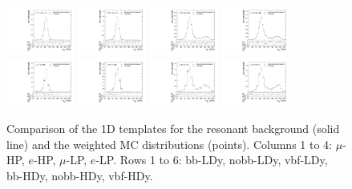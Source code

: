 \begin{figure}[htbp]
  \includegraphics[width=0.2\textwidth]{fig/2Dfit/templateVsReco_res_r0_MJ_mu_HP_nobb_HDy.pdf}
  \includegraphics[width=0.2\textwidth]{fig/2Dfit/templateVsReco_res_r0_MJ_e_HP_nobb_HDy.pdf}
  \includegraphics[width=0.2\textwidth]{fig/2Dfit/templateVsReco_res_r0_MJ_mu_LP_nobb_HDy.pdf}
  \includegraphics[width=0.2\textwidth]{fig/2Dfit/templateVsReco_res_r0_MJ_e_LP_nobb_HDy.pdf}\\
  \includegraphics[width=0.2\textwidth]{fig/2Dfit/templateVsReco_res_r0_MJ_mu_HP_vbf_HDy.pdf}
  \includegraphics[width=0.2\textwidth]{fig/2Dfit/templateVsReco_res_r0_MJ_e_HP_vbf_HDy.pdf}
  \includegraphics[width=0.2\textwidth]{fig/2Dfit/templateVsReco_res_r0_MJ_mu_LP_vbf_HDy.pdf}
  \includegraphics[width=0.2\textwidth]{fig/2Dfit/templateVsReco_res_r0_MJ_e_LP_vbf_HDy.pdf}\\
  \caption{
    Comparison of the 1D \MJ templates for the resonant background (solid line) and the weighted MC distributions (points).
    Columns 1 to 4: $\mu$-HP, $e$-HP, $\mu$-LP, $e$-LP.
    Rows 1 to 6: bb-LDy, nobb-LDy, vbf-LDy, bb-HDy, nobb-HDy, vbf-HDy.
  }
  \label{fig:1dtemplateVsReco_res_MJ_Run2}
\end{figure}

